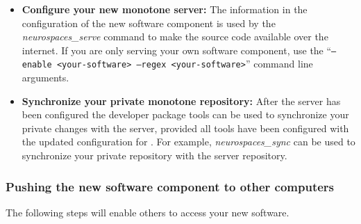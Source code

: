 \documentclass[12pt]{article}
\begin{document}
\begin{itemize}
\item {\bf Configure your new monotone server:} The information in the
  configuration of the new software component is used by the {\it
    neurospaces\_serve} command to make the source code available over
  the internet.  If you are only serving your own software component,
  use the ``{\tt --enable <your-software> --regex <your-software>}''
  command line arguments.
  
\item {\bf Synchronize your private monotone repository:} After the
  server has been configured the developer package tools can be used to
  synchronize your private changes with the server, provided all tools
  have been configured with the updated configuration for
  {\tt <your-software>}.  For example, {\it neurospaces\_sync} can be used
  to synchronize your private repository with the server repository.
\end{itemize}
  
\subsubsection*{Pushing the new software component to other computers}

The following steps will enable others to access your new software.
\end{document}
